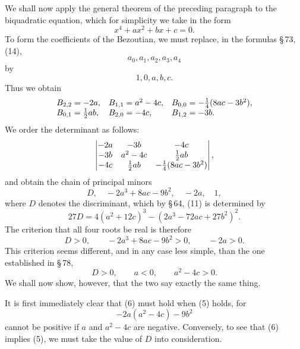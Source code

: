 \documentclass[11pt]{article}
\begin{document}
We shall now apply the general theorem of the preceding paragraph to the biquadratic equation, which for simplicity we take in the form
\begin{equation}
        x^4+ax^2+bx+c=0.
\tag{2}
\end{equation}
To form the coefficients of the Bezoutian, we must replace, in the formulas \S\,73, (14),
\[
        a_0,a_1,a_2,a_3,a_4
\]
by
\[
        1,0,a,b,c.
\]
Thus we obtain
\[
\begin{array}{lll}
 B_{2,2}=-2a, & B_{1,1}=a^2-4c, & B_{0,0}=-\frac14(8ac-3b^2),\cr
 B_{0,1}=\frac12ab, & B_{2,0}=-4c, & B_{1,2}=-3b.
\end{array}
\]
We order the determinant as follows:
\[
\begin{vmatrix}
 -2a&-3b&-4c\cr
 -3b&a^2-4c&\frac12ab\cr
 -4c&\frac12ab&-\frac14(8ac-3b^2)
\end{vmatrix},
\]
and obtain the chain of principal minors
\begin{equation}
        D,
        \quad -2a^3+8ac-9b^2,
        \quad -2a,
        \quad 1,
\tag{3}
\end{equation}
where $D$ denotes the discriminant, which by \S\,64, (11) is determined by
\begin{equation}
        27D=4(a^2+12c)^3-(2a^3-72ac+27b^2)^2.
\tag{4}
\end{equation}
The criterion that all four roots be real is therefore
\begin{equation}
        D>0,
        \qquad -2a^3+8ac-9b^2>0,
        \qquad -2a>0.
\tag{5}
\end{equation}
This criterion seems different, and in any case less simple, than the one established in \S\,78,
\begin{equation}
        D>0,
        \qquad a<0,
        \qquad a^2-4c>0.
\tag{6}
\end{equation}
We shall now show, however, that the two say exactly the same thing.

It is first immediately clear that (6) must hold when (5) holds, for
\[
        -2a(a^2-4c)-9b^2
\]
cannot be positive if $a$ and $a^2-4c$ are negative. Conversely, to see that (6) implies (5), we must take the value of $D$ into consideration.
\end{document}
